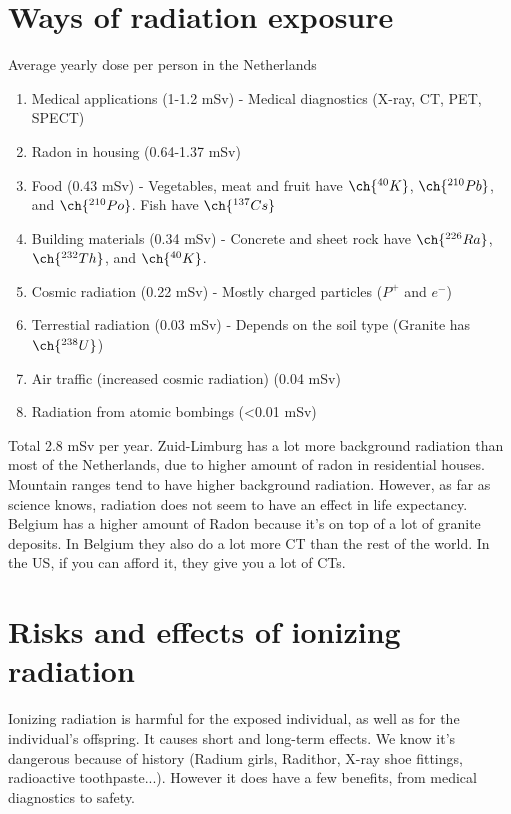 \section{Ways of radiation exposure}
Average yearly dose per person in the Netherlands
\begin{enumerate}
	\item Medical applications (1-1.2 mSv) - Medical diagnostics (X-ray, CT, PET, SPECT)
	\item Radon in housing (0.64-1.37 mSv)
	\item Food (0.43 mSv) - Vegetables, meat and fruit have $\ch{^{40}_{}K}$, $\ch{^{210}_{}Pb}$, and $\ch{^{210}_{}Po}$. Fish have $\ch{^{137}_{}Cs}$
	\item Building materials (0.34 mSv) - Concrete and sheet rock have $\ch{^{226}_{}Ra}$, $\ch{^{232}_{}Th}$, and $\ch{^{40}_{}K}$.
	\item Cosmic radiation (0.22 mSv) - Mostly charged particles ($P^+$ and $e^-$)
	\item Terrestial radiation (0.03 mSv) - Depends on the soil type (Granite has $\ch{^{238}_{}U}$)
	\item Air traffic (increased cosmic radiation) (0.04 mSv)
	\item Radiation from atomic bombings (<0.01 mSv)
\end{enumerate}
Total 2.8 mSv per year. Zuid-Limburg has a lot more background radiation than most of the Netherlands, due to higher amount of radon in residential houses. Mountain ranges tend to have higher background radiation. However, as far as science knows, radiation does not seem to have an effect in life expectancy. \\
Belgium has a higher amount of Radon because it's on top of a lot of granite deposits. In Belgium they also do a lot more CT than the rest of the world. In the US, if you can afford it, they give you a lot of CTs.\\

\section{Risks and effects of ionizing radiation}
Ionizing radiation is harmful for the exposed individual, as well as for the individual's offspring. It causes short and long-term effects. We know it's dangerous because of history (Radium girls, Radithor, X-ray shoe fittings, radioactive toothpaste...). However it does have a few benefits, from medical diagnostics to safety. 
